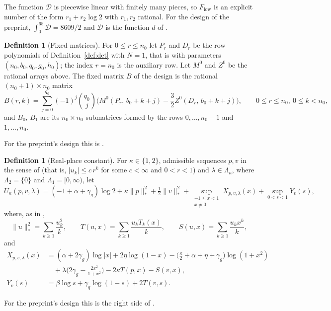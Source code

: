 \documentclass[11pt]{article}
\theoremstyle{definition}
\newtheorem{definition}[theorem]{Definition}
\newcommand{\Dl}{\mathcal{D}}
\begin{document}
The function $\Dl$ is piecewise linear with finitely many pieces, so $F_{\mathrm{low}}$ is an explicit number of the form $r_1+r_2\log2$ with $r_1,r_2$ rational. For the design of the preprint, $\int_0^{65}\Dl=8609/2$ and $\Dl$ is the function $d$ of \cite[Table~(43)]{OAI}.

\begin{definition}[Fixed matrices]\label{def:fixed}
For $0\le r\le n_0$ let $P_r$ and $D_r$ be the row polynomials of Definition~\ref{def:det} with $N=1$, that is with parameters $(n_0,b_0,q_0,g_0,h_0)$; the index $r=n_0$ is the auxiliary row. Let $M^0$ and $Z^0$ be the rational arrays above. The fixed matrix $B$ of the design is the rational $(n_0+1)\times n_0$ matrix
\[
B(r,k)=\sum_{j=0}^{q_0}(-1)^j\binom{q_0}{j}\Big(M^0(P_r,\,b_0+k+j)-\frac32Z^0(D_r,\,b_0+k+j)\Big),\qquad 0\le r\le n_0,\ 0\le k<n_0,
\]
and $B_0$, $B_1$ are its $n_0\times n_0$ submatrices formed by the rows $0,\dots,n_0-1$ and $1,\dots,n_0$.
\end{definition}

For the preprint's design this is \cite[Eq.~(47)]{OAI}.

\begin{definition}[Real-place constant]\label{def:upper}
For $\kappa\in\{1,2\}$, admissible sequences $p,v$ in the sense of \cite[Sec.~6]{OAI} (that is, $|u_k|\le c\,r^k$ for some $c<\infty$ and $0<r<1$) and $\lambda\in\Lambda_\kappa$, where $\Lambda_2=\{0\}$ and $\Lambda_1=[0,\infty)$, let
\[
U_\kappa(p,v,\lambda)=(-1+\alpha+\gamma_g)\log2+\kappa\|p\|_*^2+\tfrac12\|v\|_*^2+\sup_{\substack{-1\le x<1\\x\ne0}}X_{p,v,\lambda}(x)+\sup_{0<s<1}Y_v(s),
\]
where, as in \cite[Eq.~(77)]{OAI},
\[
\|u\|_*^2=\sum_{k\ge1}\frac{u_k^2}k,\qquad T(u,x)=\sum_{k\ge1}\frac{u_kT_k(x)}k,\qquad S(u,x)=\sum_{k\ge1}\frac{u_kx^k}k,
\]
and
\begin{align*}
X_{p,v,\lambda}(x)&=(\alpha+2\gamma_g)\log|x|+2\eta\log(1-x)-\Big(\frac\kappa2+\alpha+\eta+\gamma_g\Big)\log(1+x^2)\\
&\quad+\lambda\Big(2\gamma_g-\frac{2x^2}{1+x^2}\Big)-2\kappa T(p,x)-S(v,x),\\
Y_v(s)&=\beta\log s+\gamma_q\log(1-s)+2T(v,s).
\end{align*}
\end{definition}

For the preprint's design this is the right side of \cite[Eq.~(78)]{OAI}.
\end{document}
